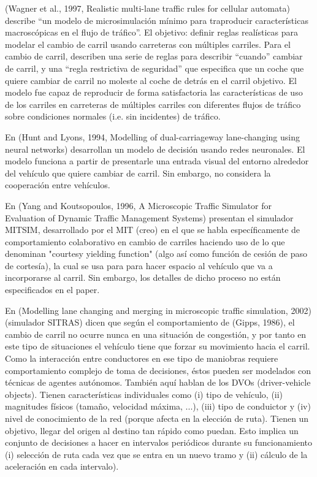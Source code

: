 (Wagner et al., 1997, Realistic multi-lane traffic rules for cellular automata) describe \enquote{un modelo de microsimulación mínimo para traproducir características macroscópicas en el flujo de tráfico}. El objetivo: definir reglas realísticas para modelar el cambio de carril usando carreteras con múltiples carriles. Para el cambio de carril, describen una serie de reglas para describir \enquote{cuando} cambiar de carril, y una \enquote{regla restrictiva de seguridad} que especifica que un coche que quiere cambiar de carril no moleste al coche de detrás en el carril objetivo. El modelo fue capaz de reproducir de forma satisfactoria las características de uso de los carriles en carreteras de múltiples carriles con diferentes flujos de tráfico sobre condiciones normales (i.e. sin incidentes) de tráfico.

En (Hunt and Lyons, 1994, Modelling of dual-carriageway lane-changing using neural networks) desarrollan un modelo de decisión usando redes neuronales. El modelo funciona a partir de presentarle una entrada visual del entorno alrededor del vehículo que quiere cambiar de carril. Sin embargo, no considera la cooperación entre vehículos.

En (Yang and Koutsopoulos, 1996, A Microscopic Traffic Simulator for Evaluation of Dynamic Traffic Management Systems) presentan el simulador MITSIM, desarrollado por el MIT (creo) en el que se habla específicamente de comportamiento colaborativo en cambio de carriles haciendo uso de lo que denominan "courtesy yielding function" (algo así como función de cesión de paso de cortesía), la cual se usa para para hacer espacio al vehículo que va a incorporarse al carril. Sin embargo, los detalles de dicho proceso no están especificados en el paper.

En (Modelling lane changing and merging in microscopic traffic simulation, 2002) (simulador SITRAS) dicen que según el comportamiento de (Gipps, 1986), el cambio de carril no ocurre nunca en una situación de congestión, y por tanto en este tipo de situaciones el vehículo tiene que forzar su movimiento hacia el carril. Como la interacción entre conductores en ese tipo de maniobras requiere comportamiento complejo de toma de decisiones, éstos pueden ser modelados con técnicas de agentes autónomos. También aquí hablan de los DVOs (driver-vehicle objects). Tienen características individuales como (i) tipo de vehículo, (ii) magnitudes físicos (tamaño, velocidad máxima, ...), (iii) tipo de conduictor y (iv) nivel de conocimiento de la red (porque afecta en la elección de ruta). Tienen un objetivo, llegar del origen al destino tan rápido como puedan. Esto implica un conjunto de decisiones a hacer en intervalos periódicos durante su funcionamiento (i) selección de ruta cada vez que se entra en un nuevo tramo y (ii) cálculo de la aceleración en cada intervalo).

